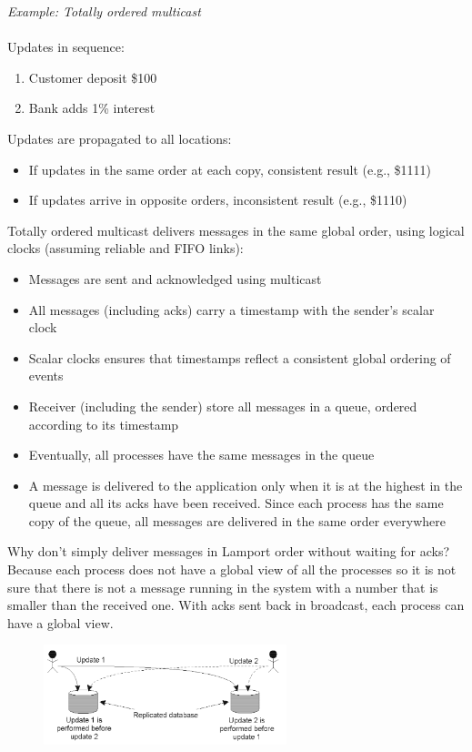 \documentclass[10pt,a4paper]{article}
\begin{document}
\textit{Example: Totally ordered multicast} \\ \\
Updates in sequence: 
\begin{enumerate}
	\item Customer deposit \$100
	\item Bank adds 1\% interest 
\end{enumerate}
Updates are propagated to all locations:
\begin{itemize}
	\item If updates in the same order at each copy, consistent result (e.g., \$1111)
	\item If updates arrive in opposite orders, inconsistent result (e.g., \$1110)
\end{itemize}
Totally ordered multicast delivers messages in the same global order, using logical clocks (assuming reliable and FIFO links):
\begin{itemize}
	\item Messages are sent and acknowledged using multicast
	\item All messages (including acks) carry a timestamp with the sender's scalar clock
	\item Scalar clocks ensures that timestamps reflect a consistent global ordering of events
	\item Receiver (including the sender) store all messages in a queue, ordered according to its timestamp
	\item Eventually, all processes have the same messages in the queue
	\item A message is delivered to the application only when it is at the highest in the queue and all its acks have been received. Since each process has the same copy of the queue, all messages are delivered in the same order everywhere
\end{itemize}
Why don't simply deliver messages in Lamport order without waiting for acks? \\ Because each process does not have a global view of all the processes so it is not sure that there is not a message running in the system with a number that is smaller than the received one. With acks sent back in broadcast, each process can have a global view.
\begin{figure}[h!]
 \hfill \includegraphics[width=200pt]{images/ordered-multicast.png}\hspace*{\fill}
  \label{fig:ordered-multicast}
\end{figure}
\pagebreak
\end{document}
